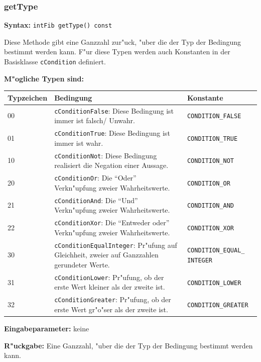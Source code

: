 \subsubsection{getType}

\textbf{Syntax:} \verb|intFib getType() const|

\bigskip\noindent
Diese Methode gibt eine Ganzzahl zur"uck, "uber die der Typ der Bedingung bestimmt werden kann. F"ur diese Typen werden auch Konstanten in der Basisklasse \verb|cCondition| definiert.

\bigskip\noindent
\textbf{M"ogliche Typen sind:}

\noindent
\begin{tabular}{|p{10mm}|p{60mm}|p{40mm}|}\hline
	Typ\-zei\-chen & Bedingung & Konstante \\\hline\hline
	00 & \verb|cConditionFalse|: Diese Bedingung ist immer ist falsch/ Unwahr. & \verb|CONDITION_FALSE| \\\hline
	01 & \verb|cConditionTrue|: Diese Bedingung ist immer ist wahr. & \verb|CONDITION_TRUE| \\\hline
	10 & \verb|cConditionNot|: Diese Bedingung realisiert die Negation einer Aussage. & \verb|CONDITION_NOT| \\\hline
	20 & \verb|cConditionOr|: Die ``Oder'' Verkn"upfung zweier Wahrheitswerte. & \verb|CONDITION_OR| \\\hline
	21 & \verb|cConditionAnd|: Die ``Und'' Verkn"upfung zweier Wahrheitswerte. & \verb|CONDITION_AND| \\\hline
	22 & \verb|cConditionXor|: Die ``Entweder oder'' Verkn"upfung zweier Wahrheitswerte. & \verb|CONDITION_XOR| \\\hline
	30 & \verb|cConditionEqualInteger|: Pr"ufung auf Gleichheit, zweier auf Ganzzahlen gerundeter Werte. & \verb|CONDITION_EQUAL_| \verb|INTEGER| \\\hline
	31 & \verb|cConditionLower|: Pr"ufung, ob der erste Wert kleiner als der zweite ist. & \verb|CONDITION_LOWER| \\\hline
	32 & \verb|cConditionGreater|: Pr"ufung, ob der erste Wert gr"o"ser als der zweite ist. & \verb|CONDITION_GREATER| \\\hline
\end{tabular}

\bigskip\noindent
\textbf{Eingabeparameter:} keine

\bigskip\noindent
\textbf{R"uckgabe:} Eine Ganzzahl, "uber die der Typ der Bedingung bestimmt werden kann.


